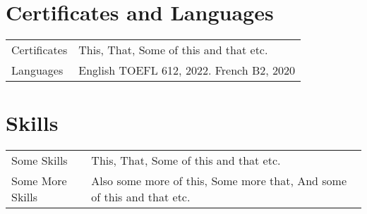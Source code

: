\documentclass[a4paper,12pt]{article}
\begin{document}

\section{Certificates and Languages}
\begin{tabularx}{\linewidth}{@{}l X@{}}
Certificates &  \normalsize{This, That, Some of this and that etc.}\\
Languages  &  \normalsize{English TOEFL 612, 2022. French B2, 2020}\\
\end{tabularx}


\section{Skills}
\begin{tabularx}{\linewidth}{@{}l X@{}}
Some Skills &  \normalsize{This, That, Some of this and that etc.}\\
Some More Skills  &  \normalsize{Also some more of this, Some more that, And some of this and that etc.}\\  
\end{tabularx}

\vfill
{}
\end{document}
